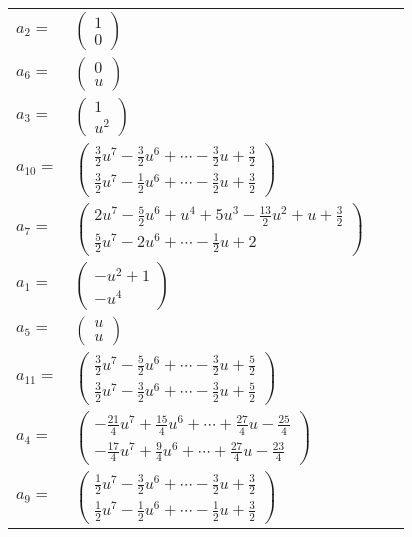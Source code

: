 \documentclass[1p]{elsarticle_modified}
\theoremstyle{definition}
\begin{document}
\begin{tabular}{m{7pt} m{180pt} m{7pt} m{180pt} }
\flushright $a_{2}=$&$\begin{pmatrix}1\\0\end{pmatrix}$ \\
\flushright $a_{6}=$&$\begin{pmatrix}0\\u\end{pmatrix}$ \\
\flushright $a_{3}=$&$\begin{pmatrix}1\\u^2\end{pmatrix}$ \\
\flushright $a_{10}=$&$\begin{pmatrix}\frac{3}{2} u^7-\frac{3}{2} u^6+\cdots-\frac{3}{2} u+\frac{3}{2}\\\frac{3}{2} u^7-\frac{1}{2} u^6+\cdots-\frac{3}{2} u+\frac{3}{2}\end{pmatrix}$ \\
\flushright $a_{7}=$&$\begin{pmatrix}2 u^7-\frac{5}{2} u^6+u^4+5 u^3-\frac{13}{2} u^2+u+\frac{3}{2}\\\frac{5}{2} u^7-2 u^6+\cdots-\frac{1}{2} u+2\end{pmatrix}$ \\
\flushright $a_{1}=$&$\begin{pmatrix}- u^2+1\\- u^4\end{pmatrix}$ \\
\flushright $a_{5}=$&$\begin{pmatrix}u\\u\end{pmatrix}$ \\
\flushright $a_{11}=$&$\begin{pmatrix}\frac{3}{2} u^7-\frac{5}{2} u^6+\cdots-\frac{3}{2} u+\frac{5}{2}\\\frac{3}{2} u^7-\frac{3}{2} u^6+\cdots-\frac{3}{2} u+\frac{5}{2}\end{pmatrix}$ \\
\flushright $a_{4}=$&$\begin{pmatrix}-\frac{21}{4} u^7+\frac{15}{4} u^6+\cdots+\frac{27}{4} u-\frac{25}{4}\\-\frac{17}{4} u^7+\frac{9}{4} u^6+\cdots+\frac{27}{4} u-\frac{23}{4}\end{pmatrix}$ \\
\flushright $a_{9}=$&$\begin{pmatrix}\frac{1}{2} u^7-\frac{3}{2} u^6+\cdots-\frac{3}{2} u+\frac{3}{2}\\\frac{1}{2} u^7-\frac{1}{2} u^6+\cdots-\frac{1}{2} u+\frac{3}{2}\end{pmatrix}$ \\

\end{tabular}
\end{document}
